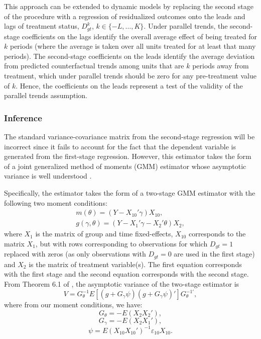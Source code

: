 This approach can be extended to dynamic models by replacing the second
stage of the procedure with a regression of residualized outcomes onto
the leads and lags of treatment status, \(D_{gt}^k\),
\(k \in \{-L, \dots, K\}\). Under parallel trends, the second-stage
coefficients on the lags identify the overall average effect of being
treated for \(k\) periods (where the average is taken over all units
treated for at least that many periods). The second-stage coefficients
on the leads identify the average deviation from predicted
counterfactual trends among units that are \(k\) periods away from
treatment, which under parallel trends should be zero for any
pre-treatment value of \(k\). Hence, the coefficients on the leads
represent a test of the validity of the parallel trends assumption.

\hypertarget{inference}{%
\subsubsection{Inference}\label{inference}}

The standard variance-covariance matrix from the second-stage regression
will be incorrect since it fails to account for the fact that the
dependent variable is generated from the first-stage regression.
However, this estimator takes the form of a joint generalized method of
moments (GMM) estimator whose asymptotic variance is well understood
\citep{newey_mcfadden_1994}.

Specifically, the estimator takes the form of a two-stage GMM estimator
with the following two moment conditions: \begin{align}
  m(\theta) = (Y-X_{10}'\gamma)X_{10}, \\
  g(\gamma, \theta) = (Y - X_1'\gamma - X_2'\theta) X_2,
\end{align} where \(X_1\) is the matrix of group and time fixed-effects,
\(X_{10}\) corresponds to the matrix \(X_1\), but with rows
corresponding to observations for which \(D_{gt} = 1\) replaced with
zeros (as only observations with \(D_{gt} = 0\) are used in the first
stage) and \(X_2\) is the matrix of treatment variable(s). The first
equation corresponds with the first stage and the second equation
corresponds with the second stage. From Theorem 6.1 of
\citet{newey_mcfadden_1994}, the asymptotic variance of the two-stage
estimator is \begin{equation}
  V = G_\theta^{-1} E\left[ (g + G_\gamma \psi)(g + G_\gamma \psi)' \right] G_\theta^{-1'},
\end{equation} where from our moment conditions, we have: \[
  G_\theta = - E\left(X_2X_2' \right),
\] \[
  G_\gamma = - E\left(X_2X_1'\right),
\] \[
  \psi = E(X_{10}X_{10}')^{-1} \varepsilon_{10} X_{10}.
\]

